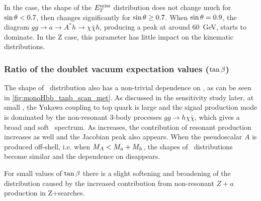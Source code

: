 In the \monohbb case, the shape of the $E_T^\mathrm{miss}$ distribution does not change much  for $\sin\theta < 0.7$, then changes significantly for $\sin\theta\geq 0.7$. 
When $\sin\theta=0.9$, the diagram $gg\rightarrow a\rightarrow A^*h \rightarrow \chi \bar{\chi} h$, producing a \MET peak at around 60~GeV, starts to dominate.
In the Z case, this parameter has little impact on the kinematic distributions.

\subsubsection{Ratio of the doublet vacuum expectation values ($\tan\beta$)}

The shape of \MET\ distribution also has a non-trivial dependence on \tanb, as can be seen in \autoref{fig:monoHbb_tanb_scan_met}.
As discussed in the sensitivity study later, at small \tanb, the Yukawa coupling to top quark is large and the signal production mode is dominated by the non-resonant 3-body processes $gg\rightarrow h\chi\bar{\chi}$, which gives a broad and soft \MET\ spectrum. 
As \tanb increases, the contribution of resonant production increases as well and the Jacobian peak also appears.
When the pseudoscalar $A$ is produced off-shell, i.e. when $M_{A}<M_{a}+M_{h}$, the shapes of \MET\ distributions become similar and the dependence on \tanb disappears.

For small values of $\tan\beta$ there is a slight softening and broadening of the \MET distribution caused by the increased contribution from non-resonant $Z+a$ production in Z+\MET searches. 

